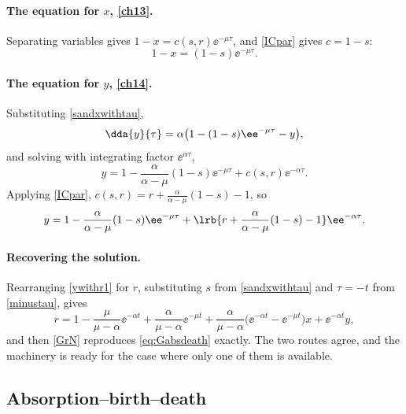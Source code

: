 \paragraph{The equation for $x$, \eqref{ch13}.}
Separating variables gives $1-x = c(s,r)\ee^{-\mu\tau}$, and \cref{ICpar} gives
$c = 1-s$:
\begin{equation}
\label{sandxwithtau}
1-x = (1-s)\ee^{-\mu\tau} .
\end{equation}

\paragraph{The equation for $y$, \eqref{ch14}.}
Substituting \cref{sandxwithtau},
\begin{equation*}
\dda{y}{\tau} = \alpha\bigl(1-(1-s)\ee^{-\mu\tau} - y\bigr),
\end{equation*}
and solving with integrating factor $\ee^{\alpha\tau}$,
\begin{equation*}
y = 1 - \frac{\alpha}{\alpha-\mu}(1-s)\ee^{-\mu\tau} + c(s,r)\ee^{-\alpha\tau} .
\end{equation*}
Applying \cref{ICpar}, $c(s,r) = r + \frac{\alpha}{\alpha-\mu}(1-s) - 1$, so
\begin{equation}
\label{ywithr1}
y = 1 - \frac{\alpha}{\alpha-\mu}(1-s)\ee^{-\mu\tau} + \lrb{r + \frac{\alpha}{\alpha-\mu}(1-s) - 1}\ee^{-\alpha\tau}.
\end{equation}

\paragraph{Recovering the solution.}
Rearranging \cref{ywithr1} for $r$, substituting $s$ from \cref{sandxwithtau} and
$\tau=-t$ from \cref{minustau}, gives
\begin{equation*}
r = 1-\frac{\mu}{\mu - \alpha}\ee^{-\alpha t} + \frac{\alpha}{\mu - \alpha}\ee^{-\mu t}
+ \frac{\alpha}{\mu - \alpha}\bigl(\ee^{-\alpha t} - \ee^{-\mu t}\bigr)x + \ee^{-\alpha t}y ,
\end{equation*}
and then \cref{GrN} reproduces \cref{eq:Gabsdeath} exactly. The two routes agree, and the
machinery is ready for the case where only one of them is available.

\subsection{Absorption--birth--death}
\label{sec:absbirthdeath}

